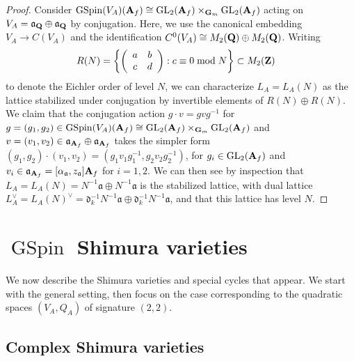 \documentclass{amsart}
\theoremstyle{definition}
\theoremstyle{definition}
\theoremstyle{definition}
\begin{document}
\begin{proof}

Consider $\operatorname{GSpin}(V_A)({\bf{A}}_f) \cong  \operatorname{GL}_2({\bf{A}}_f) \times_{{\bf{G}}_m} \operatorname{GL}_2({\bf{A}}_f)$ acting on 
$V_A = \mathfrak{a}_{\bf{Q}} \oplus \mathfrak{a}_{\bf{Q}}$ by conjugation. 
Here, we use the canonical embedding $V_A \rightarrow C(V_A)$ and the identification 
$C^0(V_A) \cong M_2({\bf{Q}}) \oplus M_2({\bf{Q}})$. Writing
\begin{align*} R(N) 
&= \left\lbrace \left( \begin{array}{cc} a & b \\ c & d \end{array} \right) : c \equiv 0 \bmod N \right\rbrace \subset M_2({\bf{Z}})\end{align*} 
to denote the Eichler order of level $N$, we can characterize $L_A = L_A(N)$ as the lattice stabilized under conjugation by invertible elements of $R(N) \oplus R(N)$. 
We claim that the conjugation action $g \cdot v = gvg^{-1}$ for $g = (g_1, g_2) \in \operatorname{GSpin}(V_A)({\bf{A}}_f) \cong  \operatorname{GL}_2({\bf{A}}_f) \times_{{\bf{G}}_m} \operatorname{GL}_2({\bf{A}}_f)$ 
and $v = (v_1, v_2) \in \mathfrak{a}_{{\bf{A}}_f} \oplus \mathfrak{a}_{{\bf{A}}_f}$ takes the simpler form 
$(g_1, g_2) \cdot (v_1, v_2) = (g_1 v_1 g_1^{-1}, g_2 v_2 g_2^{-1})$,
for $g_i \in \operatorname{GL}_2({\bf{A}}_f)$ and $v_i \in \mathfrak{a}_{{\bf{A}}_f} = [\alpha_{\mathfrak{a}}, z_{\mathfrak{a}}] {\bf{A}}_f$ for $i=1,2$. 
We can then see by inspection 
that $L_A = L_A(N) = N^{-1} \mathfrak{a} \oplus N^{-1} \mathfrak{a}$ is the stabilized lattice,
with dual lattice $L_A^{\vee} = L_A(N)^{\vee} = \mathfrak{d}_k^{-1} N^{-1} \mathfrak{a} \oplus \mathfrak{d}_k^{-1} N^{-1} \mathfrak{a}$, and 
that this lattice has level $N$. \end{proof}

\section{$\operatorname{GSpin}$ Shimura varieties}

We now describe the Shimura varieties and special cycles that appear. 
We start with the general setting, then focus on the case corresponding to the quadratic spaces $(V_A, Q_A)$ of signature $(2,2)$.

\subsection{Complex Shimura varieties}
\end{document}
